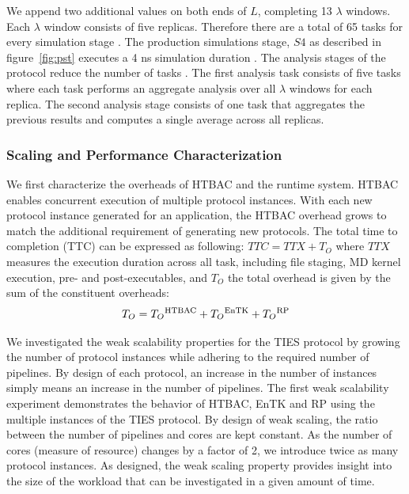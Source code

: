 We append two additional values on both ends of $L$, completing 13 $\lambda$
windows. Each $\lambda$ window consists of five replicas. Therefore there are
a total of 65 tasks for every simulation stage . The production simulations stage, $S4$ as described
in figure~\ref{fig:pst} executes a 4 ns simulation
duration . The analysis stages of the protocol reduce the number of
tasks . The first analysis task consists of five tasks where
each task performs an aggregate analysis over all $\lambda$ windows for each
replica. The second analysis stage consists of one task that aggregates the
previous results and computes a single average across all replicas.

\subsubsection{Scaling and Performance Characterization}


We first characterize the overheads of HTBAC and the runtime system. HTBAC
enables concurrent execution of multiple protocol instances. With each new
protocol instance generated for an application, the HTBAC overhead grows to
match the additional requirement of generating new protocols. The total time
to completion (TTC) can be expressed as following: $TTC = TTX + T_{O}$ where
\(TTX\) measures the execution duration across all task, including file
staging, MD kernel execution, pre- and post-executables, and $T_{O}$ the
total overhead is given by the sum of the constituent overheads: $$T_{O} =
T_{O}\textsuperscript{HTBAC} + T_{O}\textsuperscript{EnTK} +
T_{O}\textsuperscript{RP}$$



We investigated the weak scalability properties for the TIES protocol by
growing the number of protocol instances while adhering to the required
number of pipelines. By design of each protocol, an increase in the number of
instances simply means an increase in the number of pipelines. The first weak
scalability experiment demonstrates the behavior of HTBAC, EnTK and RP using
the multiple instances of the TIES protocol. By design of weak scaling, the
ratio between the number of pipelines and cores are kept constant. As the
number of cores (measure of resource) changes by a factor of 2, we introduce
twice as many protocol instances. As designed, the weak scaling property
provides insight into the size of the workload that can be investigated in a
given amount of time.

